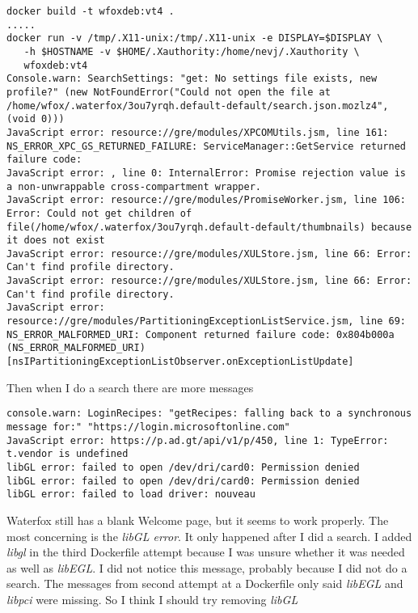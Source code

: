 \documentclass{article}  %
\begin{document}
\begin{verbatim}
docker build -t wfoxdeb:vt4 .
.....
docker run -v /tmp/.X11-unix:/tmp/.X11-unix -e DISPLAY=$DISPLAY \
   -h $HOSTNAME -v $HOME/.Xauthority:/home/nevj/.Xauthority \
   wfoxdeb:vt4
Console.warn: SearchSettings: "get: No settings file exists, new profile?" (new NotFoundError("Could not open the file at /home/wfox/.waterfox/3ou7yrqh.default-default/search.json.mozlz4", (void 0)))
JavaScript error: resource://gre/modules/XPCOMUtils.jsm, line 161: NS_ERROR_XPC_GS_RETURNED_FAILURE: ServiceManager::GetService returned failure code:
JavaScript error: , line 0: InternalError: Promise rejection value is a non-unwrappable cross-compartment wrapper.
JavaScript error: resource://gre/modules/PromiseWorker.jsm, line 106: Error: Could not get children of file(/home/wfox/.waterfox/3ou7yrqh.default-default/thumbnails) because it does not exist
JavaScript error: resource://gre/modules/XULStore.jsm, line 66: Error: Can't find profile directory.
JavaScript error: resource://gre/modules/XULStore.jsm, line 66: Error: Can't find profile directory.
JavaScript error: resource://gre/modules/PartitioningExceptionListService.jsm, line 69: NS_ERROR_MALFORMED_URI: Component returned failure code: 0x804b000a (NS_ERROR_MALFORMED_URI) [nsIPartitioningExceptionListObserver.onExceptionListUpdate]
\end{verbatim}

Then when I do a search there are more messages
\begin{verbatim}
console.warn: LoginRecipes: "getRecipes: falling back to a synchronous message for:" "https://login.microsoftonline.com"
JavaScript error: https://p.ad.gt/api/v1/p/450, line 1: TypeError: t.vendor is undefined
libGL error: failed to open /dev/dri/card0: Permission denied
libGL error: failed to open /dev/dri/card0: Permission denied
libGL error: failed to load driver: nouveau
\end{verbatim}
Waterfox still has a blank Welcome page, but it seems to work properly.
The most concerning is the {\em libGL error}. It only happened after I did a search. 
I added {\em libgl} in the third Dockerfile attempt because I was unsure whether it was needed as well as {\em libEGL}. I did not notice this message, probably because I did not do a search.  The messages from second attempt at a Dockerfile only said {\em libEGL} and {\em libpci} were missing. So I think I should try removing {\em libGL}
\end{document}

